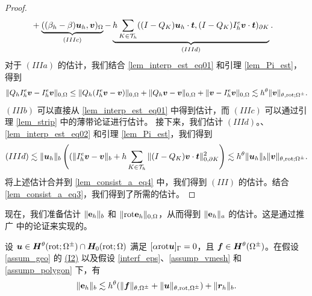 \begin{proof}
\begin{equation}
\begin{split}
& + \underbrace{ ( (\beta_h - \beta)\boldsymbol{u}_h,  \boldsymbol{v} )_{\Omega} }_{(IIIc)} - \underbrace{ h \sum_{K\in\mathcal{T}_h} ( (I-Q_K)\boldsymbol{u}_h\cdot\boldsymbol{t}, (I-Q_K) I^e_h\boldsymbol{v}\cdot\boldsymbol{t})_{\partial K} }_{(IIId)} .
\end{split}
\end{equation}
对于 $(IIIa)$ 的估计，我们结合 \eqref{lem_interp_est_eq01} 和引理 \ref{lem_Pi_est}，得到
\begin{equation}
\label{lem_consist_a_eq5}
\| Q_h I^e_h \boldsymbol{v} - I^e_h \boldsymbol{v} \|_{0,\Omega} \le \| Q_h(I^e_h\boldsymbol{v}-\boldsymbol{v}) \|_{0,\Omega} + \| Q_h \boldsymbol{v} - \boldsymbol{v} \|_{0,\Omega}
+ \| \boldsymbol{v} - I^e_h \boldsymbol{v} \|_{0,\Omega}  \lesssim h^{\theta} \| \boldsymbol{v} \|_{\theta,\mathrm{rot};\Omega^{\pm}}.
\end{equation}
$(IIIb)$ 可以直接从 \eqref{lem_interp_est_eq01} 中得到估计，而 $(IIIc)$ 可以通过引理 \ref{lem_strip} 中的薄带论证进行估计。
接下来，我们估计 $(IIId)$。、\eqref{lem_interp_est_eq02} 和引理 \ref{lem_Pi_est}，我们得到
\begin{equation}
\label{lem_consist_a_eq6}
(IIId) \lesssim \| \boldsymbol{u}_h \|_b \left(( \| I^e_h \boldsymbol{v} - \boldsymbol{v} \|_b +  h \sum_{K\in\mathcal{T}_h} \|(I - Q_K)\boldsymbol{v}\cdot\boldsymbol{t} \|^2_{0,\partial K}  \right)
\lesssim h^{\theta} \| \boldsymbol{u}_h \|_b \| \boldsymbol{v} \|_{\theta,\mathrm{rot};\Omega^{\pm}}.
\end{equation}
将上述估计合并到 \eqref{lem_consist_a_eq4} 中，我们得到 $(III)$ 的估计。结合 \eqref{lem_consist_a_eq3}，我们得到了所需的估计。
\end{proof}

现在，我们准备估计 $\|\mathbf{e}_h\|_{b}$ 和 $\| \mathrm{rot}\mathbf{e}_h \|_{0,\Omega}$，从而得到 $\| \mathbf{e}_h \|_a$ 的估计。这是通过推广 \cite{2009ZhongShuWittumXu} 中的论证来实现的。

\begin{lemma}
\label{lem_err0}
设 $\boldsymbol{u}\in \boldsymbol{H}^{\theta}(\mathrm{rot};\Omega^{\pm})\cap \boldsymbol{H}_0(\mathrm{rot};\Omega)$ 满足 $[\alpha \mathrm{rot} \boldsymbol{u}]_{\Gamma} = 0$，且 $\boldsymbol{f}\in \boldsymbol{H}^{\theta}(\Omega^{\pm}) $。在假设 \ref{assum_geo} 的 \hyperref[asp:I2]{(I2)} 以及假设 \ref{interf_eps}、\ref{assump_vmesh} 和 \ref{assump_polygon} 下，有
\begin{equation}
\label{lem_err0_eq0}
\| \mathbf{e}_h \|_{b} \lesssim h^{\theta} ( \| \boldsymbol{f} \|_{\theta,\Omega^{\pm}} + \| \boldsymbol{u} \|_{\theta,\mathrm{rot},\Omega^{\pm}})  +  \| \boldsymbol{r}_h \|_b.
\end{equation}
\end{lemma}

